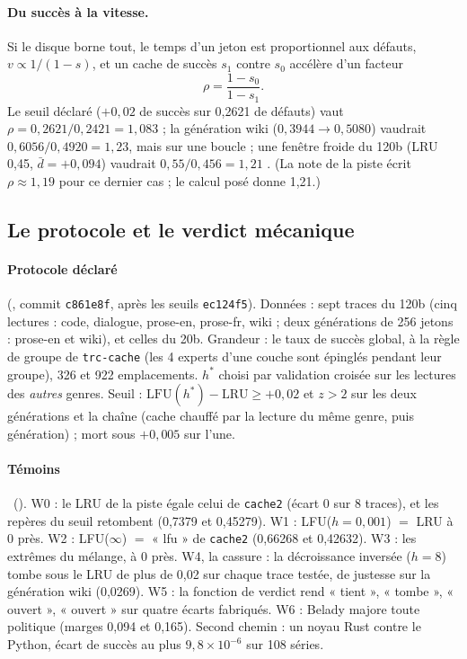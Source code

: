 \paragraph{Du succès à la vitesse.} Si le disque borne tout, le temps d'un jeton est proportionnel aux défauts, $v \propto 1/(1-s)$, et un cache de succès $s_1$ contre $s_0$ accélère d'un facteur
\begin{equation}\label{t3mim:eq:vitesse}
\rho = \frac{1 - s_0}{1 - s_1}.
\end{equation}
Le seuil déclaré ($+0{,}02$ de succès sur 0,2621 de défauts) vaut $\rho = 0{,}2621/0{,}2421 = 1{,}083$ ; la génération wiki ($0{,}3944 \to 0{,}5080$) vaudrait $0{,}6056/0{,}4920 = 1{,}23$, mais sur une boucle ; une fenêtre froide du 120b (LRU 0,45, $\bar d = +0{,}094$) vaudrait $0{,}55/0{,}456 = 1{,}21$ \calc. (La note de la piste écrit $\rho \approx 1{,}19$ pour ce dernier cas ; le calcul posé donne 1,21.)

\subsection{Le protocole et le verdict mécanique}\label{t3mim:sec:p1-verdict}

\paragraph{Protocole déclaré} (, commit \texttt{c861e8f}, après les seuils \texttt{ec124f5}). Données : sept traces du 120b (cinq lectures : code, dialogue, prose-en, prose-fr, wiki ; deux générations de 256 jetons : prose-en et wiki), et celles du 20b. Grandeur : le taux de succès global, à la règle de groupe de \texttt{trc-cache} (les 4 experts d'une couche sont épinglés pendant leur groupe), 326 et 922 emplacements. $h^\ast$ choisi par validation croisée sur les lectures des \emph{autres} genres. Seuil : $\mathrm{LFU}(h^\ast) - \mathrm{LRU} \ge +0{,}02$ et $z > 2$ sur les deux générations et la chaîne (cache chauffé par la lecture du même genre, puis génération) ; mort sous $+0{,}005$ sur l'une.

\paragraph{Témoins} \mes~(). W0 : le LRU de la piste égale celui de \texttt{cache2} (écart 0 sur 8 traces), et les repères du seuil retombent (0,7379 et 0,45279). W1 : LFU($h = 0{,}001$) $=$ LRU à 0 près. W2 : LFU($\infty$) $=$ « lfu » de \texttt{cache2} (0,66268 et 0,42632). W3 : les extrêmes du mélange, à 0 près. W4, la cassure : la décroissance inversée ($h = 8$) tombe sous le LRU de plus de 0,02 sur chaque trace testée, de justesse sur la génération wiki (0,0269). W5 : la fonction de verdict rend « tient », « tombe », « ouvert », « ouvert » sur quatre écarts fabriqués. W6 : Belady \cite{belady1966} majore toute politique (marges 0,094 et 0,165). Second chemin : un noyau Rust contre le Python, écart de succès au plus $9{,}8 \times 10^{-6}$ sur 108 séries.

